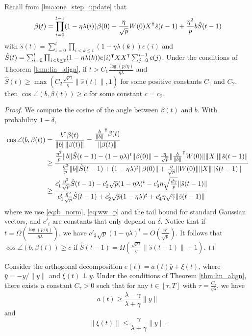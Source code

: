 \begin{lemma}
\label{lma:suf_cond}
Recall from \cref{lma:one_step_update} that
\begin{equation*}
\beta(t)=\prod_{i=0}^{t-1}(1-\eta\lambda(i))\beta(0) -\frac{\eta}{\sqrt p}W(0)X\transpose \hat{s}(t-1) +\frac{\eta^2}{p}b \hat{S}(t-1)
\end{equation*}
with $\hat{s}(t) = \sum_{i=0}^{t}\prod_{i<k\leq t}(1-\eta\lambda(k)) e(i)$ and $\hat{S}(t) = \sum_{i=0}^{t}\prod_{i<k\leq t}(1-\eta\lambda(k))e(i)\transpose XX\transpose \sum_{j=0}^{i-1}e(j)$. Under the conditions of Theorem \ref{thm:lin_align}, if $t>C_1\frac{\log (p/\eta)}{\eta\lambda}$ and $\hat{S}(t)\geq \max(C_2\frac{\sqrt{p\gamma}}{\eta}\|\hat{s}(t)\|,1)$ for some positive constants $C_1$ and $C_2$, then $\cos\angle(b, \beta(t)) \geq c$ for some constant $c=c_\delta$.
\end{lemma}
\begin{proof}
We compute the cosine of the angle between $\beta(t)$ and $b$. With probability $1-\delta$,
\begin{equation*}
\begin{aligned}
    \cos\angle(b, \beta(t))
    &= \frac{b\transpose \beta(t)}{\|b\|\|\beta(t)\|}= \frac{\frac{b}{\|b\|}\transpose \beta(t)}{\|\beta(t)\|}\\
    &\geq \frac{\frac{\eta^2}{p}\|b\|\hat{S}(t-1) - (1-\eta\lambda)^t\|\beta(0)\| - \frac{\eta}{\sqrt p}\|\frac{b}{\|b\|}\transpose W(0)\|\|X\|\|\hat{s}(t-1)\|}{\frac{\eta^2}{p}\|b\|\hat{S}(t-1)+(1-\eta\lambda)^t\|\beta(0)\| + \frac{\eta}{\sqrt p}\|W(0)\|\|X\|\|\hat{s}(t-1)\|} \\
    &\geq \frac{c'_1\frac{\eta^2}{\sqrt p}\hat{S}(t-1) - c'_2\sqrt p(1-\eta\lambda)^t- c'_3\eta\sqrt{\frac{d\gamma}{p}}\|\hat{s}(t-1)\|}{c'_1\frac{\eta^2}{\sqrt p}\hat{S}(t-1) + c'_2\sqrt p(1-\eta\lambda)^t+ c'_4\eta\sqrt{\gamma}\|\hat{s}(t-1)\|}
\end{aligned}
\end{equation*}
where we use \eqref{eq:b_norm}, \eqref{eq:ww_p} and the tail bound for standard Gaussian vectors, and $c'_i$ are constants that only depend on $\delta$. Notice that if $t=\Omega(\frac{\log (p/\eta)}{\eta\lambda})$, we have $c'_2\sqrt p(1-\eta\lambda)^t = O(\frac{\eta^2}{\sqrt p})$. It follows that $\cos\angle(b, \beta(t)) \geq c$ if $\hat{S}(t-1)=\Omega(\frac{\sqrt{p\gamma}}{\eta}\|\hat{s}(t-1)\|+1)$.
\end{proof}

\begin{lemma}
\label{lma:decomp_1}
Consider the orthogonal decomposition $e(t) = a(t)\bar{y}+\xi(t)$, where $\bar{y}=-y/\|y\|$ and $\xi(t)\perp y$. Under the conditions of Theorem \ref{thm:lin_align}, there exists a constant $C_\tau>0$ such that for any $t\in[\tau,T]$ with $\tau=\frac{C_\tau}{\eta\lambda}$, we have
\begin{equation}
\label{eq:at_lbd}
a(t)\geq \frac{\lambda - \gamma}{\lambda+\gamma}\|y\|
\end{equation}
and
\begin{equation}
\label{eq:xit_ubd}
\|\xi(t)\|\leq \frac{\gamma}{\lambda+\gamma}\|y\|.
\end{equation}
\end{lemma}

